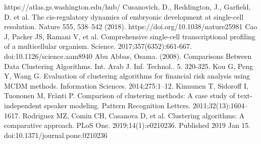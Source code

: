 \documentclass{article}
\begin{document}
\begin{thebibliography}{00}
 https://atlas.gs.washington.edu/hub/
 Cusanovich, D., Reddington, J., Garfield, D. et al. The cis-regulatory dynamics of embryonic development at single-cell resolution. Nature 555, 538–542 (2018). https://doi.org/10.1038/nature25981
 Cao J, Packer JS, Ramani V, et al. Comprehensive single-cell transcriptional profiling of a multicellular organism. Science. 2017;357(6352):661-667. doi:10.1126/science.aam8940
 Abu Abbas, Osama. (2008). Comparisons Between Data Clustering Algorithms. Int. Arab J. Inf. Technol.. 5. 320-325. 
 Kou G, Peng Y, Wang G. Evaluation of clustering algorithms for financial risk analysis using MCDM methods. Information Sciences. 2014;275:1–12.
  Kinnunen T, Sidoroff I, Tuononen M, Fränti P. Comparison of clustering methods: A case study of text-independent speaker modeling. Pattern Recognition Letters. 2011;32(13):1604–1617.
 Rodriguez MZ, Comin CH, Casanova D, et al. Clustering algorithms: A comparative approach. PLoS One. 2019;14(1):e0210236. Published 2019 Jan 15. doi:10.1371/journal.pone.0210236
\end{thebibliography}
\end{document}
